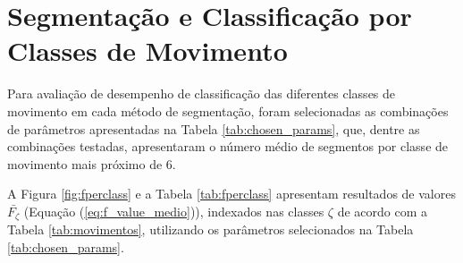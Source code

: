 		\section{Segmentação e Classificação por Classes de Movimento}
Para avaliação de desempenho de classificação das diferentes classes de movimento em cada método de segmentação, foram selecionadas as combinações de parâmetros apresentadas na Tabela \ref{tab:chosen_params}, que, dentre as combinações testadas, apresentaram o número médio de segmentos por classe de movimento mais próximo de 6.



A Figura \ref{fig:fperclass} e a Tabela \ref{tab:fperclass} apresentam resultados de valores $\bar{F_\zeta}$ (Equação (\ref{eq:f_value_medio})), indexados nas classes $\zeta$ de acordo com a Tabela \ref{tab:movimentos}, utilizando os parâmetros selecionados na Tabela \ref{tab:chosen_params}.

